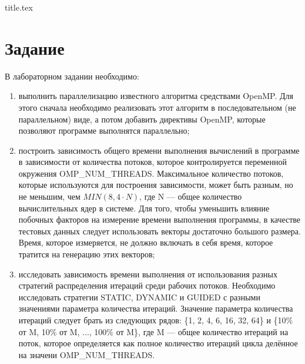 

\usepackage{csvsimple}
\usepackage{rotating}
\usepackage{listings}



{title.tex}

\clearpage
\setcounter{page}{2}

\tableofcontents
\thispagestyle{empty}

\clearpage
\pagestyle{fancy}

\clearpage

\chapter{Задание}
В лабораторном задании необходимо:
\begin{enumerate}
\item выполнить параллелизацию известного алгоритма средствами OpenMP. Для этого сначала необходимо реализовать этот алгоритм в последовательном (не параллельном) виде, а потом добавить директивы OpenMP, которые позволяют программе выполнятся параллельно;
\item построить зависимость общего времени выполнения вычислений в программе в зависимости от количества потоков, которое контролируется переменной окружения OMP\_NUM\_THREADS. Максимальное количество потоков, которые используются для построения зависимости, может быть разным, но не меньшим, чем $MIN\left(8, 4\cdot N\right)$, где N --- общее количество вычислительных ядер в системе. Для того, чтобы уменьшить влияние побочных факторов на измерение времени выполнения программы, в качестве тестовых данных следует использовать векторы достаточно большого размера. Время, которое измеряется, не должно включать в себя время, которое тратится на генерацию этих векторов; 
\item исследовать зависимость времени выполнения от использования разных стратегий распределения итераций среди рабочих потоков. Необходимо исследовать стратегии STATIC, DYNAMIC и GUIDED с разными значениями параметра количества итераций. Значение параметра количества итераций следует брать из следующих рядов: \{1, 2, 4, 6, 16, 32, 64\} и \{10\% от M, 10\% от M, ..., 100\% от M\}, где M --- общее количество итераций на поток, которое определяется как полное количество итераций цикла делённое на значени OMP\_NUM\_THREADS.
\end{enumerate}


